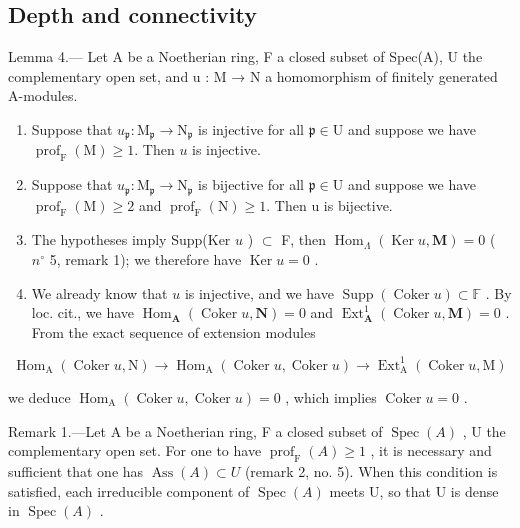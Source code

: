 \subsection{Depth and connectivity}

Lemma 4.--- Let A be a Noetherian ring, F a closed subset of Spec(A), U the complementary open set, and u : M → N a homomorphism of finitely generated A-modules.

\begin{enumerate}
\def\labelenumi{\alph{enumi})}
\item
  Suppose that \(u_{\mathfrak{p}}: \mathrm{M}_{\mathfrak{p}} \to \mathrm{N}_{\mathfrak{p}}\) is injective for all \(\mathfrak{p} \in \mathrm{U}\) and suppose we have \(\operatorname{prof}_{\mathrm{F}}(\mathrm{M}) \geqslant 1\). Then \(u\) is injective.
\item
  Suppose that \(u_{\mathfrak{p}}: \mathrm{M}_{\mathfrak{p}} \to \mathrm{N}_{\mathfrak{p}}\) is bijective for all \(\mathfrak{p} \in \mathrm{U}\) and suppose we have \(\operatorname{prof}_{\mathrm{F}}(\mathrm{M}) \geqslant 2\) and \(\operatorname{prof}_{\mathrm{F}}(\mathrm{N}) \geqslant 1\). Then u is bijective.
\item
  The hypotheses imply Supp(Ker \(u\) ) \(\subset\) F, then \(\operatorname{Hom}_{\Lambda}(\operatorname{Ker} u, \mathbf{M}) = 0\) ( \(n^{\circ}\) 5, remark 1); we therefore have \(\operatorname{Ker} u = 0\) .
\item
  We already know that \(u\) is injective, and we have \(\operatorname{Supp}(\operatorname{Coker} u) \subset \mathbb{F}\) . By loc. cit., we have \(\operatorname{Hom}_{\mathbf{A}}(\operatorname{Coker} u, \mathbf{N}) = 0\) and \(\operatorname{Ext}_{\mathbf{A}}^{1}(\operatorname{Coker} u, \mathbf{M}) = 0\) . From the exact sequence of extension modules
\end{enumerate}

\[
\operatorname{Hom} _ {\mathrm{A}} (\operatorname{Coker} u, \mathrm{N}) \rightarrow \operatorname{Hom} _ {\mathrm{A}} (\operatorname{Coker} u, \operatorname{Coker} u) \rightarrow \operatorname{Ext} _ {\mathrm{A}} ^ {1} (\operatorname{Coker} u, \mathrm{M})
\]

we deduce \(\operatorname{Hom}_{\mathrm{A}}(\operatorname{Coker} u, \operatorname{Coker} u) = 0\) , which implies \(\operatorname{Coker} u = 0\) .

Remark 1.—Let A be a Noetherian ring, F a closed subset of \(\operatorname{Spec}(A)\) , U the complementary open set. For one to have \(\operatorname{prof}_{\mathrm{F}}(A) \geqslant 1\) , it is necessary and sufficient that one has \(\operatorname{Ass}(A) \subset U\) (remark 2, no. 5). When this condition is satisfied, each irreducible component of \(\operatorname{Spec}(A)\) meets U, so that U is dense in \(\operatorname{Spec}(A)\) .

